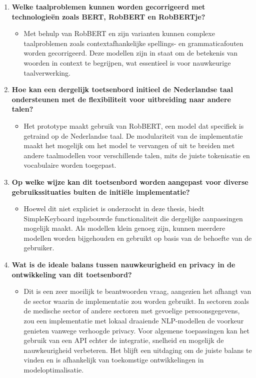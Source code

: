 \begin{enumerate}
    \item \textbf{Welke taalproblemen kunnen worden gecorrigeerd met technologieën zoals BERT, RobBERT en RobBERTje?}
    \begin{itemize}
        \item Met behulp van RobBERT en zijn varianten kunnen complexe taalproblemen zoals contextafhankelijke spellings- en grammaticafouten worden gecorrigeerd. Deze modellen zijn in staat om de betekenis van woorden in context te begrijpen, wat essentieel is voor nauwkeurige taalverwerking.
    \end{itemize}
    
    \item \textbf{Hoe kan een dergelijk toetsenbord initieel de Nederlandse taal ondersteunen met de flexibiliteit voor uitbreiding naar andere talen?}
    \begin{itemize}
        \item Het prototype maakt gebruik van RobBERT, een model dat specifiek is getraind op de Nederlandse taal. De modulariteit van de implementatie maakt het mogelijk om het model te vervangen of uit te breiden met andere taalmodellen voor verschillende talen, mits de juiste tokenisatie en vocabulaire worden toegepast.
    \end{itemize}
    
    \item \textbf{Op welke wijze kan dit toetsenbord worden aangepast voor diverse gebruikssituaties buiten de initiële implementatie?}
    \begin{itemize}
        \item Hoewel dit niet expliciet is onderzocht in deze thesis, biedt SimpleKeyboard ingebouwde functionaliteit die dergelijke aanpassingen mogelijk maakt. Als modellen klein genoeg zijn, kunnen meerdere modellen worden bijgehouden en gebruikt op basis van de behoefte van de gebruiker.
    \end{itemize}
    
    \item \textbf{Wat is de ideale balans tussen nauwkeurigheid en privacy in de ontwikkeling van dit toetsenbord?}
    \begin{itemize}
        \item Dit is een zeer moeilijk te beantwoorden vraag, aangezien het afhangt van de sector waarin de implementatie zou worden gebruikt. In sectoren zoals de medische sector of andere sectoren met gevoelige persoonsgegevens, zou een implementatie met lokaal draaiende NLP-modellen de voorkeur genieten vanwege verhoogde privacy. Voor algemene toepassingen kan het gebruik van een API echter de integratie, snelheid en mogelijk de nauwkeurigheid verbeteren. Het blijft een uitdaging om de juiste balans te vinden en is afhankelijk van toekomstige ontwikkelingen in modeloptimalisatie.
    \end{itemize}
    

\end{enumerate}
